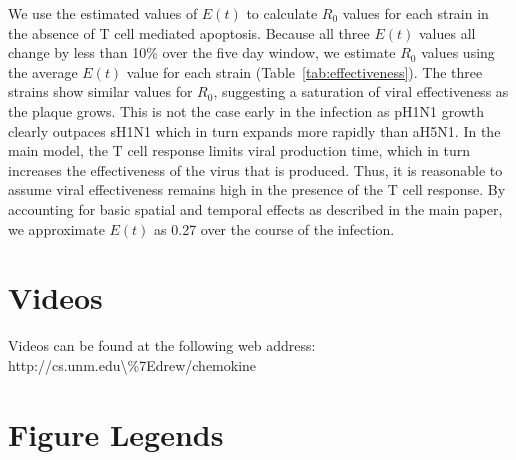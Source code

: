 \documentclass[preprint,10pt,authoryear]{elsarticle}
\newcommand{\removed}[1]{{\color{dkred}\sout{#1}}}
\newcommand{\drew}[1]{{\color{dkgreen}#1}}
\newcommand{\fred}[1]{{\color{dkblue}#1}}
\begin{document}
We use the estimated values of $E(t)$ to calculate $R_0$ values for each strain in the absence of T cell mediated apoptosis.  Because all three $E(t)$ values all change by less than 10\% over the five day window, we estimate $R_0$ values using the average $E(t)$ value for each strain (Table~\ref{tab:effectiveness}).  The three strains show similar values for $R_0$, suggesting a saturation of viral effectiveness as the plaque grows.   This is not the case early in the infection as pH1N1 growth clearly outpaces sH1N1 which in turn expands more rapidly than aH5N1.  In the main model, the T cell response limits viral production time, which in turn increases the effectiveness of the virus that is produced.  Thus, it is reasonable to assume viral effectiveness remains high in the presence of the T cell response.  By accounting for basic spatial and temporal effects as described in the main paper, we approximate $E(t)$ as 0.27 over the course of the infection.


%


\section*{Videos}

Videos can be found at the following web address: http://cs.unm.edu\textbackslash\%7Edrew/chemokine




\pagebreak

\section*{Figure Legends}
\end{document}
